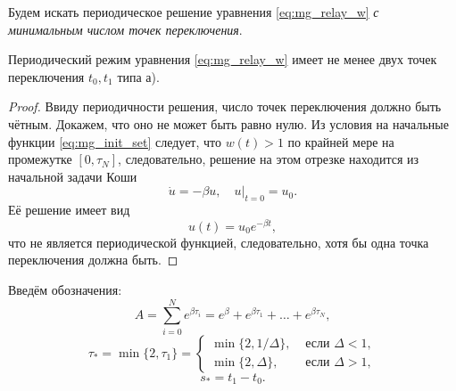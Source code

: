 Будем искать периодическое решение уравнения \eqref{eq:mg_relay_w} \emph{с минимальным числом точек переключения}.

\begin{lemma}
	\label{prop:switching_points_2}
	Периодический режим уравнения \eqref{eq:mg_relay_w} имеет не менее двух точек переключения $t_0, t_1$ типа а).
\end{lemma}
\begin{proof}
	Ввиду периодичности решения, число точек переключения должно быть чётным. Докажем, что оно не может быть равно нулю. Из условия на начальные функции \eqref{eq:mg_init_set} следует, что $w(t) > 1$ по крайней мере на промежутке $[0, \tau_N]$, следовательно, решение на этом отрезке находится из начальной задачи Коши
	\begin{equation*}
		\dot{u} = -\beta u, \quad u|_{t=0} = u_0.
	\end{equation*}
	Её решение имеет вид
	\begin{equation*}
		u(t) = u_0 e^{-\beta t},
	\end{equation*}
	что не является периодической функцией, следовательно, хотя бы одна точка переключения должна быть.
\end{proof}

Введём обозначения:
%
\begin{equation*}
	A = \sum_{i=0}^{N}e^{\beta \tau_{i}}=e^\beta+e^{\beta \tau_1}+\ldots+e^{\beta \tau_{N}},
\end{equation*}
\begin{equation*}
	\tau_* = \min\{2,\tau_1\}=\left\lbrace\begin{array}{cl}
		\min\{2,1/\Delta\}, & \text{ если } \Delta<1,
		\\
		\min\{2,\Delta\}, & \text{ если } \Delta>1,
	\end{array}\right.
\end{equation*}
\begin{equation*}
	s_* = t_1-t_0.
\end{equation*}

